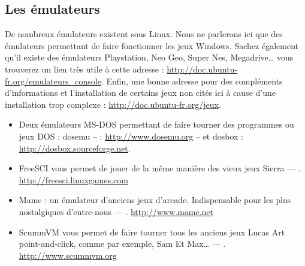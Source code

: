 \subsection{Les émulateurs}
De nombreux émulateurs existent sous Linux. Nous ne parlerons ici que des émulateurs permettant de faire fonctionner les jeux Windows. Sachez également qu'il existe des émulateurs Playstation, Neo Geo, Super Nes, Megadrive\ldots{} vous trouverez un lien très utile à cette adresse : \url{http://doc.ubuntu-fr.org/emulateurs_console}. Enfin, une bonne adresse pour des compléments d'informations et l'installation de certains jeux non cités ici à cause d'une installation trop complexe : \url{http://doc.ubuntu-fr.org/jeux}.
\begin{itemize}
\item Deux émulateurs MS-DOS permettant de faire tourner des programmes ou jeux DOS : dosemu --  : \url{http://www.dosemu.org} -- et dosbox  : \url{http://dosbox.sourceforge.net}.
\item FreeSCI vous permet de jouer de la même manière des vieux jeux Sierra --- . \url{http://freesci.linuxgames.com}
\item Mame : un émulateur d'anciens jeux d'arcade. Indispensable pour les plus nostalgiques d'entre-nous --- . \url{http://www.mame.net}
\item ScummVM vous permet de faire tourner tous les anciens jeux Lucas Art point-and-click, comme par exemple, Sam Et Max\ldots{}  --- . \url{http://www.scummvm.org}
\end{itemize}
